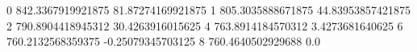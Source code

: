 0 842.3367919921875 81.87274169921875
1 805.3035888671875 44.83953857421875
2 790.8904418945312 30.4263916015625
4 763.8914184570312 3.4273681640625
6 760.2132568359375 -0.25079345703125
8 760.4640502929688 0.0
